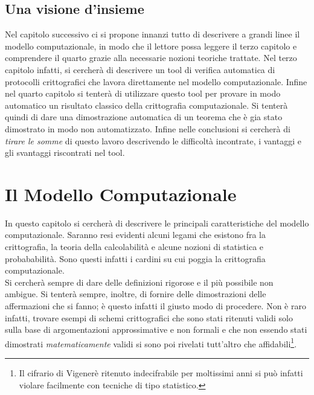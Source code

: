 \documentclass[a4paper,openright,twoside,12pt]{report}
\begin{document}
\section{Una visione d'insieme}
Nel capitolo successivo ci si propone innanzi tutto di descrivere a grandi linee il modello computazionale, 
in modo che il lettore possa leggere il terzo capitolo e comprendere il quarto grazie alla necessarie
nozioni teoriche trattate. Nel terzo capitolo infatti, si cercher\`a di descrivere un tool di verifica 
automatica di protocolli crittografici che lavora direttamente nel modello computazionale. Infine nel quarto capitolo
si tenter\`a di utilizzare questo tool per provare in modo automatico un risultato classico della crittografia
computazionale. Si tenter\`a quindi di dare una dimostrazione automatica di un teorema che \`e gia stato
dimostrato in modo non automatizzato.
Infine nelle conclusioni si cercher\`a di \emph{tirare le somme} di questo lavoro descrivendo le difficolt\`a incontrate,
i vantaggi e gli svantaggi riscontrati nel tool.
\chapter{Il Modello Computazionale}
In questo capitolo si cercher\`a di descrivere le principali caratteristiche del modello computazionale. Saranno resi evidenti alcuni legami che
esistono fra la crittografia, la teoria della calcolabilit\`a e alcune nozioni di statistica e probababilit\`a. Sono questi infatti i cardini su cui poggia la crittografia
computazionale.\\ 
Si cercher\`a sempre di dare delle definizioni rigorose e il pi\`u possibile non ambigue. 
Si tenter\`a sempre, inoltre, di fornire delle dimostrazioni delle affermazioni che si fanno; \`e questo infatti il giusto modo di procedere.
Non \`e raro infatti, trovare esempi di schemi crittografici che sono stati ritenuti validi solo sulla base di argomentazioni approssimative e non formali e 
che non essendo stati dimostrati \emph{matematicamente} validi si sono poi rivelati tutt'altro che affidabili\footnote{Il cifrario di Vigener\`e ritenuto indecifrabile per 
moltissimi anni si può infatti violare facilmente con tecniche di tipo statistico.}.
\end{document}

